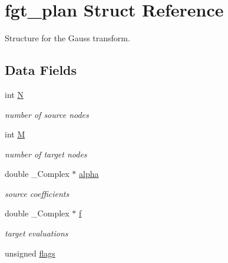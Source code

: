 \hypertarget{structfgt__plan}{
\section{fgt\_\-plan Struct Reference}
\label{structfgt__plan}
}
Structure for the Gauss transform.  


\subsection*{Data Fields}
\begin{CompactItemize}
\item 
\hypertarget{structfgt__plan_fbd9662ab140a1c55ded8928b2be3e87}{
int \hyperlink{structfgt__plan_fbd9662ab140a1c55ded8928b2be3e87}{N}}
\label{structfgt__plan_fbd9662ab140a1c55ded8928b2be3e87}

\begin{CompactList}\small\item\em number of source nodes \item\end{CompactList}\item 
\hypertarget{structfgt__plan_64030dcfd57263db29ff440c6cdd26aa}{
int \hyperlink{structfgt__plan_64030dcfd57263db29ff440c6cdd26aa}{M}}
\label{structfgt__plan_64030dcfd57263db29ff440c6cdd26aa}

\begin{CompactList}\small\item\em number of target nodes \item\end{CompactList}\item 
\hypertarget{structfgt__plan_9c17084806d4d213bed15e6391c90d1a}{
double \_\-Complex $\ast$ \hyperlink{structfgt__plan_9c17084806d4d213bed15e6391c90d1a}{alpha}}
\label{structfgt__plan_9c17084806d4d213bed15e6391c90d1a}

\begin{CompactList}\small\item\em source coefficients \item\end{CompactList}\item 
\hypertarget{structfgt__plan_7efff13d6d5f6c21c134e06ffae7fff1}{
double \_\-Complex $\ast$ \hyperlink{structfgt__plan_7efff13d6d5f6c21c134e06ffae7fff1}{f}}
\label{structfgt__plan_7efff13d6d5f6c21c134e06ffae7fff1}

\begin{CompactList}\small\item\em target evaluations \item\end{CompactList}\item 
\hypertarget{structfgt__plan_081f3a5e595025f27b4bfd89a3f74869}{
unsigned \hyperlink{structfgt__plan_081f3a5e595025f27b4bfd89a3f74869}{flags}}
\label{structfgt__plan_081f3a5e595025f27b4bfd89a3f74869}


\end{CompactItemize}

